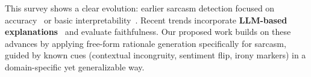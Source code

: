 This survey shows a clear evolution: earlier sarcasm detection focused on accuracy~\cite{oprea2025llm} or basic interpretability~\cite{kumar2021explainable,bagate2025sarcasm}. Recent trends incorporate \textbf{LLM-based explanations}~\cite{bueno2026scoring,inoue2026lime} and evaluate faithfulness. Our proposed work builds on these advances by applying free-form rationale generation specifically for sarcasm, guided by known cues (contextual incongruity, sentiment flip, irony markers) in a domain-specific yet generalizable way.
